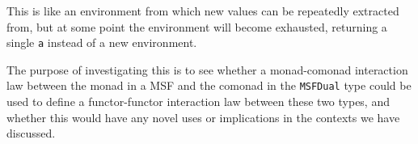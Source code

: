 This is like an environment from which new values can be repeatedly extracted from, but at some point the environment will become exhausted, returning a single \verb+a+ instead of a new environment.

The purpose of investigating this is to see whether a monad-comonad interaction law \cite{uustalu:2019} between the monad in a MSF and the comonad in the \verb+MSFDual+ type could be used to define a functor-functor interaction law between these two types, and whether this would have any novel uses or implications in the contexts we have discussed.